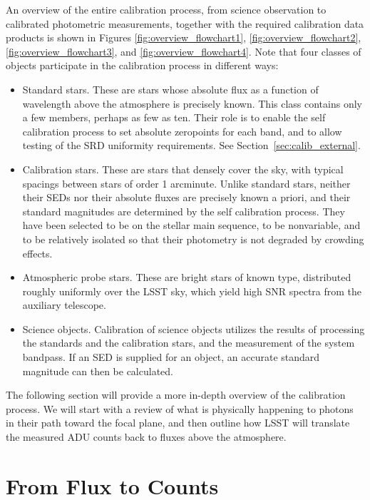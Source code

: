 \documentclass[12pt,preprint]{aastex}
\begin{document}
An overview of the entire calibration process, from science observation
to calibrated photometric measurements, together with the required
calibration data products is shown in
Figures \ref{fig:overview_flowchart1}, \ref{fig:overview_flowchart2}, 
\ref{fig:overview_flowchart3}, and \ref{fig:overview_flowchart4}.  
Note that four classes of objects participate in the calibration process in different ways:
\begin{itemize}
\item Standard stars.  These are stars whose absolute flux as a function of wavelength above the atmosphere is precisely known.  This class contains only a few members, perhaps as few as ten.  Their role is to enable the self calibration process to set absolute zeropoints for each band, and to allow testing of the SRD uniformity requirements.  See Section~\ref{sec:calib_external}.
\item Calibration stars.  These are stars that densely cover the sky, with typical spacings between stars of order 1 arcminute.  Unlike standard stars, neither their SEDs nor their absolute fluxes are precisely known a priori, and their standard magnitudes are determined by the self calibration process.   They have been selected to be on the stellar main sequence, to be nonvariable, and to be relatively isolated so that their photometry is not degraded by crowding effects.
\item Atmospheric probe stars.   These are bright stars of known type, distributed roughly uniformly over the LSST sky, which yield high SNR spectra from the auxiliary telescope.  
\item Science objects.  Calibration of science objects utilizes the results of processing the standards and the calibration stars, and the measurement of the system bandpass.   If an SED is supplied for an object, an accurate standard magnitude can then be calculated.
\end{itemize}

The following section will provide a more in-depth overview of the
calibration process. We will start with a review of what
is physically happening to photons in their path toward the focal
plane, and then outline how LSST will translate the
measured ADU counts back to fluxes above the atmosphere.

\section{From Flux to Counts}
\label{sec:photons2counts}
\end{document}
